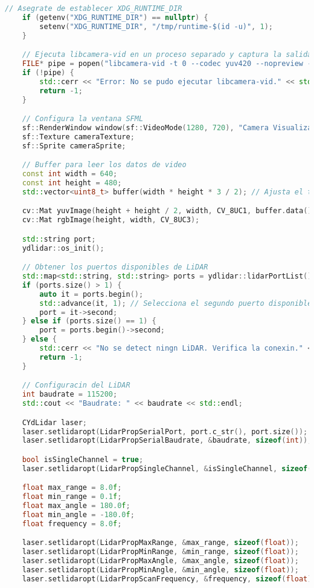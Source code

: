 \begin{lstlisting}[language={C++}, caption={Tercer ajuste de c\'odigo}, label={TercerAjuste}]
    // Asegrate de establecer XDG_RUNTIME_DIR
    if (getenv("XDG_RUNTIME_DIR") == nullptr) {
        setenv("XDG_RUNTIME_DIR", "/tmp/runtime-$(id -u)", 1);
    }

    // Ejecuta libcamera-vid en un proceso separado y captura la salida en YUV, sin previsualizacn
    FILE* pipe = popen("libcamera-vid -t 0 --codec yuv420 --nopreview -o -", "r");
    if (!pipe) {
        std::cerr << "Error: No se pudo ejecutar libcamera-vid." << std::endl;
        return -1;
    }

    // Configura la ventana SFML
    sf::RenderWindow window(sf::VideoMode(1280, 720), "Camera Visualization with LiDAR");
    sf::Texture cameraTexture;
    sf::Sprite cameraSprite;

    // Buffer para leer los datos de video
    const int width = 640;
    const int height = 480;
    std::vector<uint8_t> buffer(width * height * 3 / 2); // Ajusta el tamao del buffer para YUV420

    cv::Mat yuvImage(height + height / 2, width, CV_8UC1, buffer.data());
    cv::Mat rgbImage(height, width, CV_8UC3);

    std::string port;
    ydlidar::os_init();

    // Obtener los puertos disponibles de LiDAR
    std::map<std::string, std::string> ports = ydlidar::lidarPortList();
    if (ports.size() > 1) {
        auto it = ports.begin();
        std::advance(it, 1); // Selecciona el segundo puerto disponible
        port = it->second;
    } else if (ports.size() == 1) {
        port = ports.begin()->second;
    } else {
        std::cerr << "No se detect ningn LiDAR. Verifica la conexin." << std::endl;
        return -1;
    }

    // Configuracin del LiDAR
    int baudrate = 115200;
    std::cout << "Baudrate: " << baudrate << std::endl;

    CYdLidar laser;
    laser.setlidaropt(LidarPropSerialPort, port.c_str(), port.size());
    laser.setlidaropt(LidarPropSerialBaudrate, &baudrate, sizeof(int));

    bool isSingleChannel = true;
    laser.setlidaropt(LidarPropSingleChannel, &isSingleChannel, sizeof(bool));

    float max_range = 8.0f;
    float min_range = 0.1f;
    float max_angle = 180.0f;
    float min_angle = -180.0f;
    float frequency = 8.0f;

    laser.setlidaropt(LidarPropMaxRange, &max_range, sizeof(float));
    laser.setlidaropt(LidarPropMinRange, &min_range, sizeof(float));
    laser.setlidaropt(LidarPropMaxAngle, &max_angle, sizeof(float));
    laser.setlidaropt(LidarPropMinAngle, &min_angle, sizeof(float));
    laser.setlidaropt(LidarPropScanFrequency, &frequency, sizeof(float));


\end{lstlisting}
